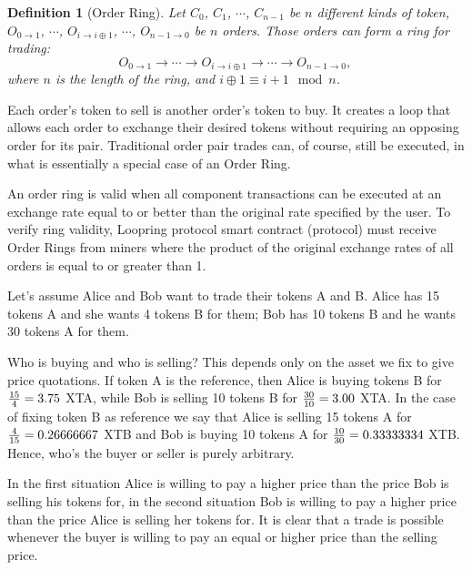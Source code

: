 \documentclass[UTF8,nofonts]{article}
\makeatletter
\newtheorem{definition}{Definition}[section]
\newenvironment{figurehere}
 {\def\@captype{figure}}
 {}
\makeatother
\begin{document}
\begin{multicols}{2}
\begin{center}
\begin{figurehere}
\caption{A Ring of 3 Orders}
\label{fig:ring}
\end{figurehere}
\end{center}




\begin{definition}[Order Ring] Let $C_{0}$, $C_{1}$, $\cdots$, $C_{n-1}$ be $n$ different kinds of token, $O_{0\rightarrow 1}$, $\cdots$, $O_{i\rightarrow i\oplus 1}$, $\cdots$, $O_{n-1 \rightarrow 0}$ be $n$ orders. Those orders can form a ring for trading:
$$O_{0\rightarrow 1} \rightarrow \cdots \rightarrow O_{i\rightarrow i\oplus 1} \rightarrow \cdots \rightarrow O_{n-1\rightarrow 0} \text{, }$$
where $n$ is the length of the ring, and $i\oplus 1 \equiv i+1 \mod n$.
\end{definition}

Each order's token to sell is another order's token to buy. It creates a loop that allows each order to exchange their desired tokens without requiring an opposing order for its pair. Traditional order pair trades can, of course, still be executed, in what is essentially a special case of an Order Ring. 

An order ring is valid when all component transactions can be executed at an exchange rate equal to or better than the original rate specified by the user. To verify ring validity, Loopring protocol smart contract (protocol) must receive Order Rings from miners where the product of the original exchange rates of all orders is equal to or greater than 1.

Let's assume Alice and Bob want to trade their tokens A and B. Alice has 15 tokens A and she wants 4 tokens B for them; Bob has 10 tokens B  and he wants 30 tokens A for them.

Who is buying and who is selling? This depends only on the asset we fix to give price quotations. If token A is the reference, then Alice is buying tokens B for ${15 \over 4} = 3.75$ XTA, while Bob is selling 10 tokens B for ${30 \over 10} = 3.00$ XTA. In the case of fixing token B as reference we say that Alice is selling 15 tokens A for ${4\over 15}=0.26666667$ XTB and Bob is buying 10 tokens A for ${10 \over 30}=0.33333334$ XTB. Hence, who's the buyer or seller is purely arbitrary.

In the first situation Alice is willing to pay a higher price than the price Bob is selling his tokens for, in the second situation Bob is willing to pay a higher price than the price Alice is selling her tokens for. It is clear that a trade is possible whenever the buyer is willing to pay an equal or higher price than the selling price.


\end{multicols}
\end{document}
